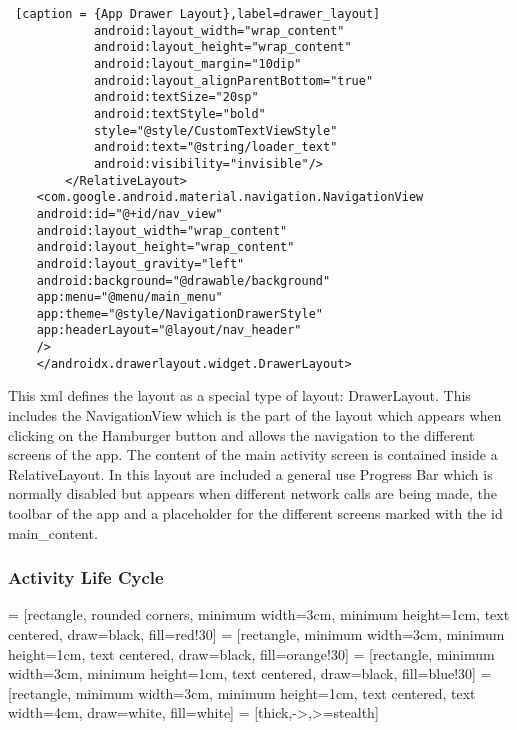 \begin{lstlisting} [caption = {App Drawer Layout},label=drawer_layout]
			android:layout_width="wrap_content"
			android:layout_height="wrap_content"
			android:layout_margin="10dip"
			android:layout_alignParentBottom="true"
			android:textSize="20sp"
			android:textStyle="bold"
			style="@style/CustomTextViewStyle"
			android:text="@string/loader_text"
			android:visibility="invisible"/>
		</RelativeLayout>
	<com.google.android.material.navigation.NavigationView
	android:id="@+id/nav_view"
	android:layout_width="wrap_content"
	android:layout_height="wrap_content"
	android:layout_gravity="left"
	android:background="@drawable/background"
	app:menu="@menu/main_menu"
	app:theme="@style/NavigationDrawerStyle"
	app:headerLayout="@layout/nav_header"
	/>
	</androidx.drawerlayout.widget.DrawerLayout>
\end{lstlisting}
 
This xml defines the layout as a special type of layout: DrawerLayout. This includes the NavigationView which is the part of the layout which appears when clicking on the Hamburger button and allows the navigation to the different screens of the app. The content of the main activity screen is contained inside a RelativeLayout. In this layout are included a general use Progress Bar which is normally disabled but appears when different network calls are being made, the toolbar of the app and a placeholder for the different screens marked with the id main\_content.

\subsubsection { Activity Life Cycle }

 = [rectangle, rounded corners, minimum width=3cm, 
minimum height=1cm, text centered, draw=black, fill=red!30]
 = [rectangle, minimum width=3cm, minimum height=1cm, text centered, draw=black, fill=orange!30]
 = [rectangle, minimum width=3cm, minimum height=1cm, text centered, draw=black, fill=blue!30]
 = [rectangle, minimum width=3cm, minimum height=1cm, text centered,
text width=4cm, draw=white, fill=white]
 = [thick,->,>=stealth]

